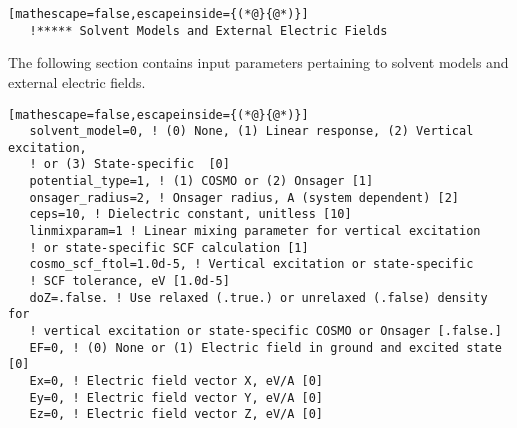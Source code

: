 \begin{lstlisting}[mathescape=false,escapeinside={(*@}{@*)}]
   !***** Solvent Models and External Electric Fields
\end{lstlisting}
\noindent The following section contains input parameters pertaining to solvent models and external electric fields.
\begin{lstlisting}[mathescape=false,escapeinside={(*@}{@*)}]
   solvent_model=0, ! (0) None, (1) Linear response, (2) Vertical excitation, 
   ! or (3) State-specific  [0]
   potential_type=1, ! (1) COSMO or (2) Onsager [1]
   onsager_radius=2, ! Onsager radius, A (system dependent) [2]
   ceps=10, ! Dielectric constant, unitless [10]
   linmixparam=1 ! Linear mixing parameter for vertical excitation 
   ! or state-specific SCF calculation [1]
   cosmo_scf_ftol=1.0d-5, ! Vertical excitation or state-specific 
   ! SCF tolerance, eV [1.0d-5]
   doZ=.false. ! Use relaxed (.true.) or unrelaxed (.false) density for 
   ! vertical excitation or state-specific COSMO or Onsager [.false.]
   EF=0, ! (0) None or (1) Electric field in ground and excited state [0]
   Ex=0, ! Electric field vector X, eV/A [0]
   Ey=0, ! Electric field vector Y, eV/A [0]
   Ez=0, ! Electric field vector Z, eV/A [0] 
\end{lstlisting}
